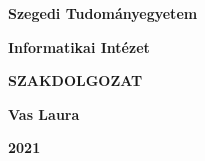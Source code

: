 \documentclass[12pt]{report}
\begin{document}
\thispagestyle{empty}

\begin{center}
{\Large\bf Szegedi Tudományegyetem}

\vspace{0.5cm}

{\Large\bf Informatikai Intézet}

\vspace*{8.5cm}


{\Huge\bf SZAKDOLGOZAT}


\vspace*{7cm}

{\LARGE\bf Vas Laura}

\vspace*{0.6cm}

{\Large\bf 2021}

\end{center}
\end{document}
